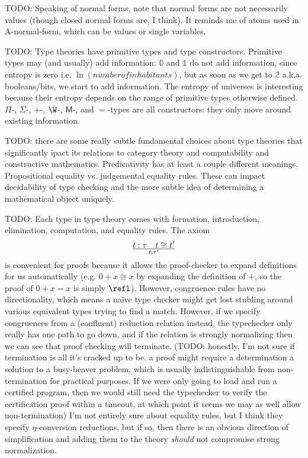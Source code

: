\documentclass[11pt]{article} %
\theoremstyle{definition}
\theoremstyle{remark}
\begin{document}
TODO:
Speaking of normal forms, note that normal forms are not necessarily values (though closed normal forms are, I think).
It reminds me of atoms used in A-normal-form, which can be values or single variables.

TODO:
Type theories have primitive types and type constructors.
Primitive types may (and usually) add information:
  $\mathbb 0$ and $\mathbb 1$ do not add information, since entropy is zero i.e. $\ln(number of inhabitants)$,
  but as soon as we get to $\mathbb 2$ a.k.a. booleans/bits, we start to add information.
The entropy of universes is interesting because their entropy depends on the range of primitive types otherwise defined.
$\Pi$-, $\Sigma$-, $+$-, $\W$-, $\mathsf M$-, and $=$-types are all constructors: they only move around existing information.

TODO: there are some really subtle fundamental choices about type theories that significantly ipact its relations to category theory and computability and constructive mathematics.
Predicativity has at least a couple different meanings. Propositional equality vs. judgemental equality rules.
These can impact decidability of type checking and the more subtle idea of determining a mathematical object uniquely.


TODO:
Each type in type theory comes with formation, introduction, elimination, computation, and equality rules.
The axiom $$t : \tau \quad t \cong t' \over t : \tau'$$ is convenient for proofs because it allows the proof-checker to expand definitions for us automatically (e.g. $0 + x \cong x$ by expanding the definition of $+$, so the proof of $0 + x = x$ is simply $\refl$).
However, congruence rules have no directionality, which means a na\"ive type checker might get lost stubling around various equivalent types trying to find a match.
However, if we specify congruences from a (confluent) reduction relation instead, the typechecker only really has one path to go down, and if the relation is strongly normalizing then we can see that proof checking will terminate.
(TODO: honestly, I'm not sure if termination is all it's cracked up to be. a proof might require a determination a solution to a busy-beaver problem, which is usually indistinguishable from non-termination for practical purposes. If we were only going to load and run a certified program, then we would still need the typechecker to verify the certification proof within a timeout, at which point it seems we may as well allow non-termination)
I'm not entirely sure about equality rules, but I think they specify $\eta$-conversion reductions, but if so, then there is an obvious direction of simplification and adding them to the theory \emph{should} not compromise strong normalization.
\end{document}
